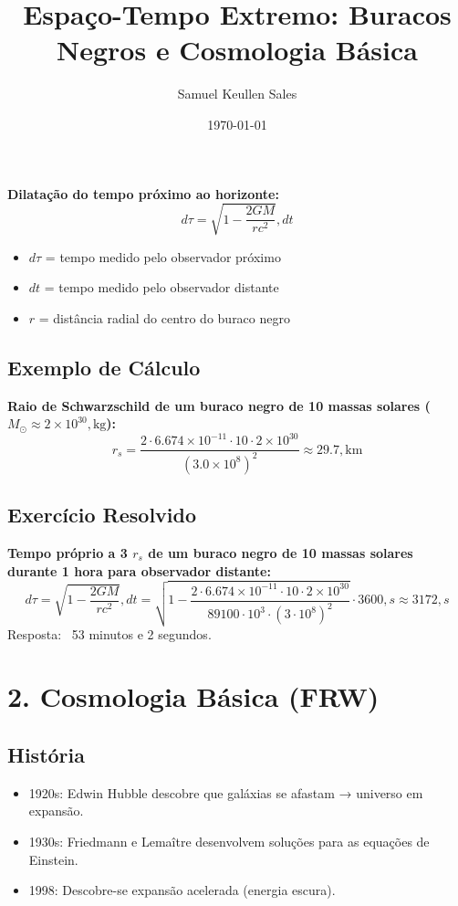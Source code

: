 \documentclass[12pt,a4paper]{article} \usepackage[utf8]{inputenc} \usepackage{amsmath, amssymb} \usepackage{geometry} \usepackage{hyperref} \usepackage{graphicx} \geometry{margin=1in} \title{Espaço-Tempo Extremo: Buracos Negros e Cosmologia Básica} \author{Samuel Keullen Sales} \date{\today}
\begin{document}
\textbf{Dilatação do tempo próximo ao horizonte:} \begin{equation} d\tau = \sqrt{1 - \frac{2GM}{rc^2}} , dt \end{equation} \begin{itemize} \item $d\tau$ = tempo medido pelo observador próximo \item $dt$ = tempo medido pelo observador distante \item $r$ = distância radial do centro do buraco negro \end{itemize}

\subsection*{Exemplo de Cálculo} \textbf{Raio de Schwarzschild de um buraco negro de 10 massas solares ($M_\odot \approx 2 \times 10^{30} , \mathrm{kg}$):} \begin{equation} r_s = \frac{2 \cdot 6.674 \times 10^{-11} \cdot 10 \cdot 2 \times 10^{30}}{(3.0 \times 10^8)^2} \approx 29.7 , \mathrm{km} \end{equation}

\subsection*{Exercício Resolvido} \textbf{Tempo próprio a 3 $r_s$ de um buraco negro de 10 massas solares durante 1 hora para observador distante:} \begin{equation} d\tau = \sqrt{1 - \frac{2GM}{rc^2}} , dt = \sqrt{1 - \frac{2 \cdot 6.674 \times 10^{-11} \cdot 10 \cdot 2 \times 10^{30}}{89100 \cdot 10^3 \cdot (3 \cdot 10^8)^2}} \cdot 3600 , s \approx 3172 , s \end{equation} Resposta: ~53 minutos e 2 segundos.

\newpage \section*{2. Cosmologia Básica (FRW)}

\subsection*{História} \begin{itemize} \item 1920s: Edwin Hubble descobre que galáxias se afastam → universo em expansão. \item 1930s: Friedmann e Lemaître desenvolvem soluções para as equações de Einstein. \item 1998: Descobre-se expansão acelerada (energia escura). \end{itemize}
\end{document}
